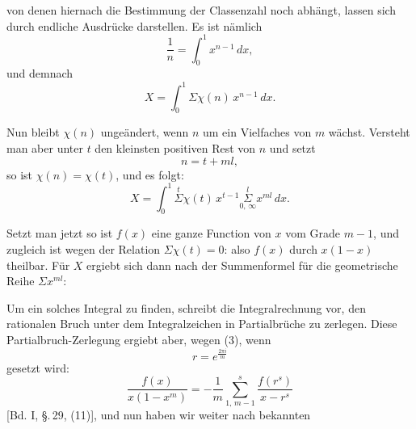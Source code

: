 von denen hiernach die Bestimmung der Classenzahl noch abhängt, lassen
sich durch endliche Ausdrücke darstellen. Es ist nämlich
\[
\frac{1}{n} = \int_0^1 x^{n-1}\,dx,
\]
und demnach
\[
X = \int_0^1 \Sigma \chi(n)\,x^{n-1}\,dx.
\]

Nun bleibt $\chi(n)$ ungeändert, wenn $n$ um ein Vielfaches von $m$ wächst.
Versteht man aber unter $t$ den kleinsten positiven Rest von $n$ und setzt
\[
n = t + ml,
\]
so ist $\chi(n) = \chi(t)$, und es folgt:
\[
X = \int_0^1 \overset{t}{\Sigma} \chi(t)\,x^{t-1} \underset{0,\,\infty}{\overset{l}{\Sigma}} x^{ml}\,dx.
\]

Setzt man jetzt
so ist $f(x)$ eine ganze Function von $x$ vom Grade $m-1$, und zugleich ist
wegen der Relation $\Sigma \chi(t) = 0$:
also $f(x)$ durch $x(1-x)$ theilbar. Für $X$ ergiebt sich dann nach der
Summenformel für die geometrische Reihe $\Sigma x^{ml}$:

Um ein solches Integral zu finden, schreibt die Integralrechnung vor, den
rationalen Bruch unter dem Integralzeichen in Partialbrüche zu zerlegen.
Diese Partialbruch-Zerlegung ergiebt aber, wegen (3), wenn
\[
r = e^{\frac{2\pi i}{m}}
\]
gesetzt wird:
\[
\frac{f(x)}{x(1-x^m)} = -\frac{1}{m} \sum\limits_{1,\,m-1}^{s} \frac{f(r^s)}{x-r^s}
\]
[Bd. I, \S.\,29, (11)], und nun haben wir weiter nach bekannten
